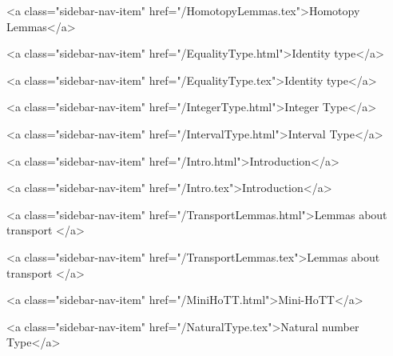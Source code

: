       
        
          <a class="sidebar-nav-item" href="/HomotopyLemmas.tex">Homotopy Lemmas</a>
        
      
    
      
        
          <a class="sidebar-nav-item" href="/EqualityType.html">Identity type</a>
        
      
    
      
        
          <a class="sidebar-nav-item" href="/EqualityType.tex">Identity type</a>
        
      
    
      
        
          <a class="sidebar-nav-item" href="/IntegerType.html">Integer Type</a>
        
      
    
      
        
          <a class="sidebar-nav-item" href="/IntervalType.html">Interval Type</a>
        
      
    
      
        
          <a class="sidebar-nav-item" href="/Intro.html">Introduction</a>
        
      
    
      
        
          <a class="sidebar-nav-item" href="/Intro.tex">Introduction</a>
        
      
    
      
        
          <a class="sidebar-nav-item" href="/TransportLemmas.html">Lemmas about transport </a>
        
      
    
      
        
          <a class="sidebar-nav-item" href="/TransportLemmas.tex">Lemmas about transport </a>
        
      
    
      
        
          <a class="sidebar-nav-item" href="/MiniHoTT.html">Mini-HoTT</a>
        
      
    
      
        
          <a class="sidebar-nav-item" href="/NaturalType.tex">Natural number Type</a>
        
      
    
